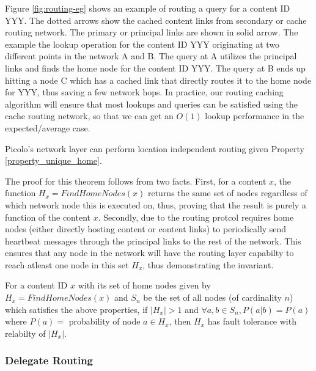 Figure \ref{fig:routing-eg} shows an example of routing a query for a content ID YYY. The dotted arrows show the cached content links from
secondary or cache routing network. The primary or principal links are shown in solid arrow. The example the lookup operation
for the content ID YYY originating at two different points in the network A and B. The query at A utilizes the principal
links and finds the home node for the content ID YYY. The query at B ends up hitting a node C which has a cached link that
directly routes it to the home node for YYY, thus saving a few network hops. In practice, our routing caching algorithm will
ensure that most lookups and queries can be satisfied using the cache routing network, so that we can get an \(O(1)\) lookup
performance in the expected/average case.

\begin{theorem}
Picolo's network layer can perform location independent routing given Property \ref{property_unique_home}.
\end{theorem}

The proof for this theorem follows from two facts. First, for a content \(x\), the function \(H_x = FindHomeNodes(x)\) returns
the same set of nodes regardless of which network node this is executed on, thus, proving that the result is purely a function
of the content \(x\). Secondly, due to the routing protcol requires home nodes (either directly hosting content or content links)
to periodically send heartbeat messages through the principal links to the rest of the network. This ensures that any node in the 
network will have the routing layer capabilty to reach atleast one node in this set \(H_x\), thus demonstrating the invariant. 

\begin{theorem}
   
    For a content ID \(x\) with its set of home nodes given by \( H_x = FindHomeNodes(x) \) and \(S_n\) be the set of
all nodes (of cardinality \(n\)) which satisfies the above properties, if \( |H_x| > 1 \) and \( \forall a, b \in S_n,
    P(a|b) = P(a) \) where \( P(a) = \) probability of node \(a \in H_x \), then \(H_x\) has fault tolerance with
    relabilty of \( | H_x | \).
\end{theorem}

\subsubsection{Delegate Routing}

